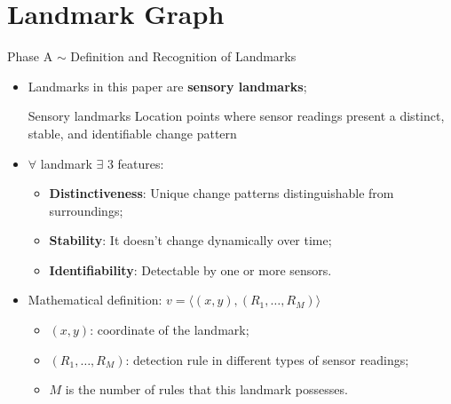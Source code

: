 \section{Landmark Graph}
\begin{frame}{Phase A $\sim$ Definition and Recognition of Landmarks}
    \begin{itemize}
        \item Landmarks in this paper are \textbf{sensory landmarks};
            \begin{block}{Sensory landmarks}
                Location points where sensor readings present a distinct, stable, and identifiable change pattern
            \end{block}
        \item $\forall$ landmark $\exists$ 3 features:
            \begin{itemize}
                \item \textbf{Distinctiveness}: Unique change patterns distinguishable from surroundings;
                \item \textbf{Stability}: It doesn't change dynamically over time;
                \item \textbf{Identifiability}: Detectable by one or more sensors.
            \end{itemize}
        \item Mathematical definition: \( v = \langle (x, y), (R_1, \ldots, R_M) \rangle \)
            \begin{itemize}
                  \item $(x, y)$: coordinate of the landmark;
                  \item $(R_1, \dots ,R_M)$: detection rule in different types of sensor readings;
                  \item $M$ is the number of rules that this landmark possesses.
            \end{itemize}
    \end{itemize}
\end{frame}

